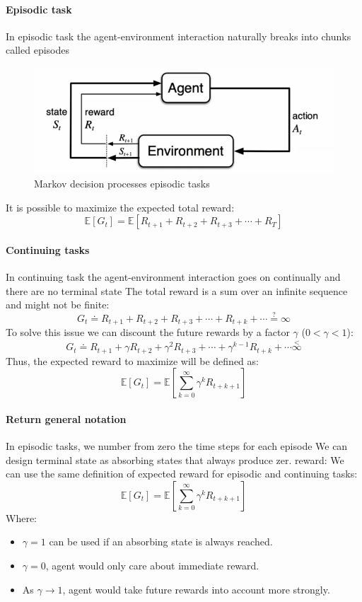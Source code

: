 \paragraph*{Episodic task}
In episodic task the agent-environment interaction naturally breaks into chunks
called episodes
\begin{figure}[H]
    \centering
    \includegraphics[width=0.75\linewidth]{images/rl.png}
    \caption{Markov decision processes episodic tasks}
\end{figure}
It is possible to maximize the expected total reward:
\[\mathbb{E}\left[G_t\right]=\mathbb{E}\left[R_{t+1}+R_{t+2}+R_{t+3}+\cdots+R_T\right]\]

\paragraph*{Continuing tasks}
In continuing task the agent-environment interaction goes on continually and
there are no terminal state
The total reward is a sum over an infinite sequence and might not be finite:
\[G_t\doteq R_{t+1}+R_{t+2}+R_{t+3}+\cdots+R_{t+k}+\cdots\overset{?}{=}\infty\]
To solve this issue we can discount the future rewards by a factor $\gamma$ ($0 < \gamma < 1$):
\[G_t\doteq R_{t+1}+\gamma R_{t+2}+\gamma^2R_{t+3}+\cdots+\gamma^{k-1}R_{t+k}+\cdots\overset<\infty\]
Thus, the expected reward to maximize will be defined as:
\[\mathbb{E}\left[G_t\right]=\mathbb{E}\left[\sum_{k=0}^{\infty}\gamma^kR_{t+k+1}\right]\]

\paragraph*{Return general notation}
In episodic tasks, we number from zero the time steps for each episode
We can design terminal state as absorbing states that always produce zer. reward:
We can use the same definition of expected reward for episodic and continuing
tasks:
\[\mathbb{E}\left[G_t\right]=\mathbb{E}\left[\sum_{k=0}^{\infty}\gamma^kR_{t+k+1}\right]\]
Where:
\begin{itemize}
    \item $\gamma = 1$ can be used if an absorbing state is always reached.
    \item $\gamma =0$, agent would only care about immediate reward.
    \item As $\gamma \rightarrow 1$, agent would take future rewards into account more strongly.
\end{itemize}

